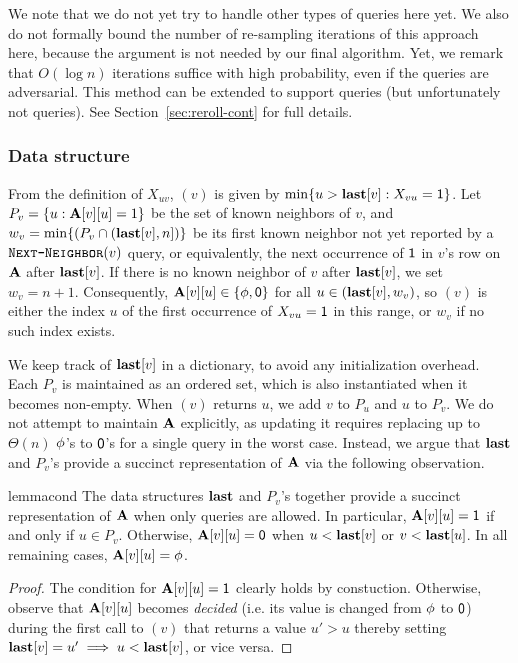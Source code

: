 We note that we do not yet try to handle other types of queries here yet.
We also do not formally bound the number of re-sampling iterations of this approach here, because the argument is not needed by our final algorithm.
Yet, we remark that $O(\log n)$ iterations suffice with high probability, even if the queries are adversarial.
This method can be extended to support  queries (but unfortunately not  queries).
See Section~\ref{sec:reroll-cont} for full details.

\subsubsection{Data structure}\label{sec:nn-ds}

From the definition of $X_{uv}$, $(v)$ is given by $\min\{u > \mathbf{last}[v]: X_{vu} = \mathsf{1}\}$.
Let $P_v = \{u: \mathbf{A}[v][u]=1\}$ be the set of known neighbors of $v$, and $w_v = \min \{(P_v \cap (\mathbf{last}[v], n])\}$ be its first known neighbor
not yet reported by a $\texttt{\textsc{Next-Neighbor}}(v)$ query, or equivalently, the next occurrence of $\mathsf{1}$ in $v$'s row on $\mathbf{A}$ after $\mathbf{last}[v]$.
If there is no known neighbor of $v$ after $\mathbf{last}[v]$, we set $w_v = n+1$.
Consequently, $\mathbf{A}[v][u] \in \{\phi,\mathsf{0}\}$ for all $u \in (\mathbf{last}[v], w_v)$,
so $(v)$ is either the index $u$ of the first occurrence of $X_{vu} = \mathsf{1}$ in this range, or $w_v$ if no such index exists.

We keep track of $\mathbf{last}[v]$ in a dictionary, to avoid any initialization overhead.
Each $P_v$ is maintained as an ordered set, which is also instantiated when it becomes non-empty.
When $(v)$ returns $u$, we add $v$ to $P_u$ and $u$ to $P_v$.
We do not attempt to maintain $\mathbf{A}$ explicitly, as updating it requires replacing up to $\Theta(n)$ $\phi$'s to $\mathsf{0}$'s
for a single  query in the worst case.
Instead, we argue that $\mathbf{last}$ and $P_v$'s provide a succinct representation of $\mathbf{A}$ via the following observation.

\begin{restatable}{lemma}{cond}\label{lem:cond-0}
The data structures $\mathbf{last}$ and $P_v$'s together provide a succinct representation of $\mathbf{A}$ when only  queries are allowed. In particular, $\mathbf{A}[v][u]=\mathsf{1}$ if and only if $u \in P_v$. Otherwise, $\mathbf{A}[v][u]=\mathsf{0}$ when $u <\mathbf{last}[v]$ or $v < \mathbf{last}[u]$. In all remaining cases, $\mathbf{A}[v][u]=\phi$.
\end{restatable}
\begin{proof}
The condition for $\mathbf{A}[v][u]=\mathsf{1}$ clearly holds by constuction.
Otherwise, observe that $\mathbf{A}[v][u]$ becomes \emph{decided} (i.e. its value is changed from $\phi$ to $\mathsf{0}$)
during the first call to $(v)$ that returns a value $u' > u$ thereby setting $\mathbf{last}[v] = u' \implies u<\mathbf{last}[v]$, or vice versa.
\end{proof}

